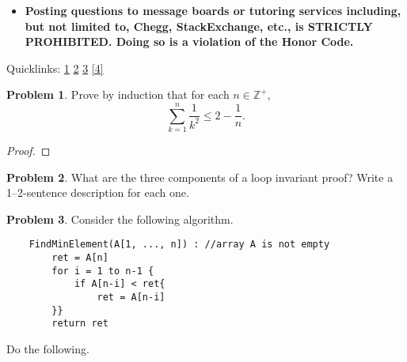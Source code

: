 \documentclass[12pt]{article}
\theoremstyle{definition}
\theoremstyle{definition}
\newtheorem{problem}{Problem}
\theoremstyle{definition}
\begin{document}
\begin{small}
\begin{itemize}
	\item \textbf{Posting questions to message boards or tutoring services including, but not limited to, Chegg, StackExchange, etc., is STRICTLY PROHIBITED. Doing so is a violation of the Honor Code.}
\end{itemize}

Quicklinks: \ref{1} \ref{2} \ref{3} \ref{4}
\vspace{-4mm} 
\end{small}


\hrulefill
\newpage
\begin{problem}  \label{1}
Prove by induction that for each $n \in \mathbb{Z}^{+}$,
\[
\sum_{k=1}^{n} \frac{1}{k^{2}} \leq 2 - \frac{1}{n}.
\]
\end{problem}

\begin{proof}
\end{proof}

\newpage
\begin{problem} \label{2}
What are the three components of a loop invariant proof? Write a 1--2-sentence description for each one.
\end{problem}


\newpage
\begin{problem} \label{3}
Consider the following algorithm. 
\begin{small}
	\begin{verbatim}
	FindMinElement(A[1, ..., n]) : //array A is not empty
	    ret = A[n]
	    for i = 1 to n-1 {
	        if A[n-i] < ret{
	            ret = A[n-i]	           
	    }}
	    return ret
	\end{verbatim}
\end{small}

\noindent Do the following.
\end{problem}
\end{document}
